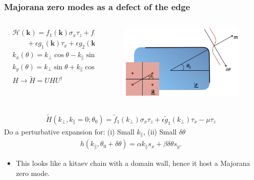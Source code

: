 \documentclass{beamer}
\renewcommand{\(}{\left(}
\renewcommand{\)}{\right)}
\renewcommand{\[}{\left[}
\renewcommand{\]}{\right]}
\begin{document}
\begin{frame}
    \frametitle{Majorana zero modes as a defect of the edge}
    \begin{columns}
        \begin{column}{0.55\textwidth}
            \begin{align*}
                &\mathcal{H}(\bm k) = f_1 (\bm k) \sigma_x\tau_z + f_2(\bm k) \sigma_z\tau_z  \\
                & \qquad + \epsilon g_1(\bm k) \tau_x + \epsilon g_2(\bm k) \tau_y - \mu\tau_z \\ 
                &k_x(\theta)=k_\perp \cos\theta - k_\| \sin\theta \nonumber\\
                &k_y(\theta)=k_\perp \sin\theta + k_\| \cos\theta \\
                &H\to \tilde H= UHU^\dagger \\ 
                \end{align*}
        \end{column}
        \begin{column}{0.45\textwidth}
            \begin{figure}[]
                \centering
                \includegraphics[scale=0.35]{corner_without_C4.png}
            \end{figure}
        \end{column}
    \end{columns}
    \begin{align*}
        \tilde H(k_\perp,k_\|=0;\theta_0)=\tilde f_1(k_\perp)  \sigma_x\tau_z  + \epsilon \tilde g_1(k_\perp) \tau_x  - \mu\tau_z 
    \end{align*}
    Do a perturbative expansion for: 
    (i)  Small $k_\| $, 
    (ii) Small $\delta \theta$
    \begin{align*}
        h(k_{\|}, \theta_0+\delta\theta) = \alpha k_\| s_x + \beta \delta\theta s_y.
    \end{align*}
    \begin{itemize}
        \item This looks like a kitaev chain with a domain wall, hence it host a Majorana zero mode. 
    \end{itemize}
\end{frame}
\end{document}
